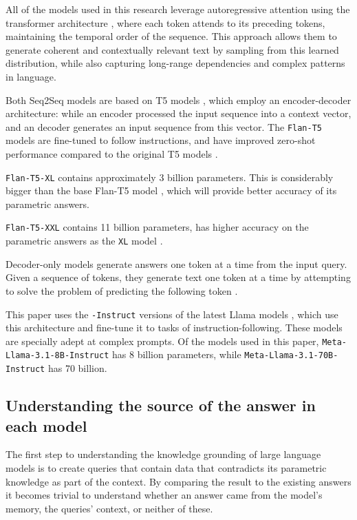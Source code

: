 

All of the models used in this research leverage autoregressive attention using the transformer architecture \cite{attention_is_all_you_need}, where each token attends to its preceding tokens, maintaining the temporal order of the sequence.
This approach allows them to generate coherent and contextually relevant text by sampling from this learned distribution, while also capturing long-range dependencies and complex patterns in language.

Both Seq2Seq models are based on T5 models \cite{t5}, which employ an encoder-decoder architecture: while an encoder processed the input sequence into a context vector, and an decoder generates an input sequence from this vector.
The \texttt{Flan-T5} models are fine-tuned to follow instructions, and have improved zero-shot performance compared to the original T5 models \cite{flant5}.

\texttt{Flan-T5-XL} contains approximately 3 billion parameters.
This is considerably bigger than the base Flan-T5 model \cite{flant5}, which will provide better accuracy of its parametric answers.

\texttt{Flan-T5-XXL} contains 11 billion parameters, has higher accuracy on the parametric answers as the \texttt{XL} model \cite{flant5}.

Decoder-only models generate answers one token at a time from the input query.
Given a sequence of tokens, they generate text one token at a time by attempting to solve the problem of predicting the following token \cite{gpt}.

This paper uses the \texttt{-Instruct} versions of the latest Llama models \cite{llama3}, which use this architecture and fine-tune it to tasks of instruction-following.
These models are specially adept at complex prompts.
Of the models used in this paper, \texttt{Meta-Llama-3.1-8B-Instruct} has 8 billion parameters, while \texttt{Meta-Llama-3.1-70B-Instruct} has 70 billion.

\subsection{Understanding the source of the answer in each model}
\label{query_design}

The first step to understanding the knowledge grounding of large language models is to create queries that contain data that contradicts its parametric knowledge as part of the context.
By comparing the result to the existing answers it becomes trivial to understand whether an answer came from the model's memory, the queries' context, or neither of these.


